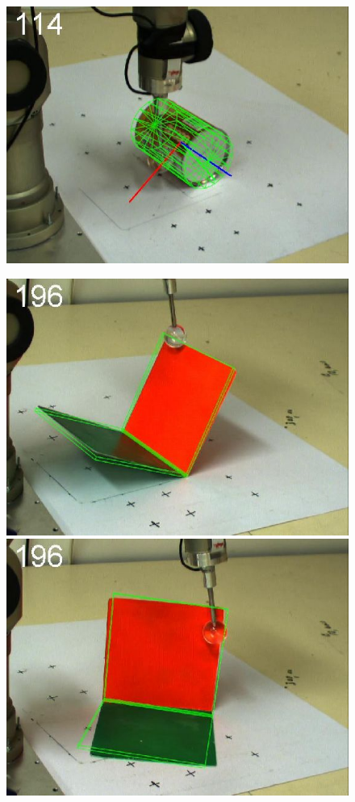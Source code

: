 \begin{figure}[htbp]
{\includegraphics[width=\imgAXwid]{./A3_physx_39_2}
}
\centerline{
\includegraphics[width=\imgAXwid]{./A1_2exp_667_3}
\includegraphics[width=\imgAXwid]{./A1_2exp_876_3}
}
\end{figure}
